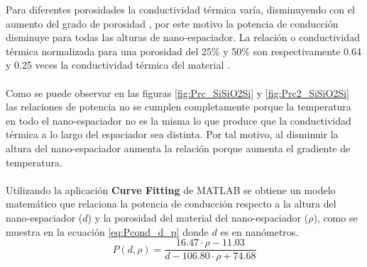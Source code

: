 Para diferentes porosidades la conductividad térmica varía, disminuyendo con el aumento del grado de porosidad \cite{ThermalConductivity_SiO2_2018}, por este motivo la potencia de conducción disminuye para todas las alturas de nano-espaciador. La relación o conductividad térmica normalizada para una porosidad del 25\% y 50\% son respectivamente 0.64 y 0.25 veces la conductividad térmica del material \cite{ThermalConductivity_SiO2_2018}.\\\\
Como se puede observar en las figuras \ref{fig:Prc_SiSiO2Si} y \ref{fig:Prc2_SiSiO2Si} las relaciones de potencia no se cumplen completamente porque la temperatura en todo el nano-espaciador no es la misma lo que produce que la conductividad térmica a lo largo del espaciador sea distinta. Por tal motivo, al disminuir la altura del nano-espaciador aumenta la relación porque aumenta el gradiente de temperatura.\\\\
Utilizando la aplicación \textbf{Curve Fitting} de MATLAB se obtiene un modelo matemático que relaciona la potencia de conducción respecto a la altura del nano-espaciador ($d$) y la porosidad del material del nano-espaciador ($\rho$), como se muestra en la ecuación \eqref{eq:Pcond_d_p} donde $d$ es en nanómetros.
\begin{equation}
P(d,\rho)=\frac{  16.47\cdot \rho-11.03 }{d-106.80\cdot \rho +74.68}
\label{eq:Pcond_d_p}
\end{equation}
